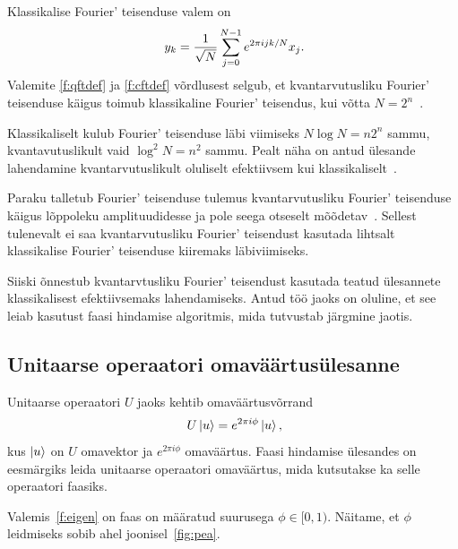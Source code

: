 \documentclass[12pt]{report}
\def\ket#1{\mathinner{|#1\rangle}}
\begin{document}
Klassikalise Fourier' teisenduse valem on
\begin{align}\label{f:cftdef}
    y_k = \frac{1}{\sqrt{N}} \sum_{j=0}^{N-1}e^{2\pi ijk/N} x_j \rlap{.}
\end{align}
Valemite \ref{f:qftdef} ja \ref{f:cftdef} võrdlusest selgub, et kvantarvutusliku Fourier' teisenduse käigus toimub klassikaline Fourier' teisendus, kui võtta \(N = 2^n\)~\cite{nielsen+chuang}.

Klassikaliselt kulub Fourier' teisenduse läbi viimiseks \(N \log{N}=n 2^n \) sammu, kvantavutuslikult vaid \(\log^2{N} = n^2\) sammu.
Pealt näha on antud ülesande lahendamine kvantarvutuslikult oluliselt efektiivsem kui klassikaliselt~\cite{nielsen+chuang}.

Paraku talletub Fourier' teisenduse tulemus kvantarvutusliku Fourier' teisenduse käigus lõppoleku amplituudidesse ja pole seega otseselt mõõdetav~\cite{nielnse+chuang}.
Sellest tulenevalt ei saa kvantarvutusliku Fourier' teisendust kasutada lihtsalt klassikalise Fourier' teisenduse kiiremaks läbiviimiseks.


Siiski õnnestub kvantarvtusliku Fourier' teisendust kasutada teatud ülesannete klassikalisest efektiivsemaks lahendamiseks.
Antud töö jaoks on oluline, et see leiab kasutust faasi hindamise algoritmis, mida tutvustab järgmine jaotis.


\subsection{Unitaarse operaatori omaväärtusülesanne}\label{sec:unitary}

Unitaarse operaatori \(U\) jaoks kehtib omaväärtusvõrrand
\begin{align}\label{f:eigen}
    U \ket{u} = e^{2\pi i\phi} \ket{u}\rlap{,}
\end{align}
kus \(\ket{u}\) on \(U\) omavektor ja \(e^{2\pi i\phi}\) omaväärtus.
Faasi hindamise ülesandes on eesmärgiks leida unitaarse operaatori omaväärtus, mida kutsutakse ka selle operaatori faasiks.

Valemis~\ref{f:eigen} on faas on määratud suurusega \(\phi \in [0, 1)\).
Näitame, et \(\phi\) leidmiseks sobib ahel joonisel~\ref{fig:pea}.
\end{document}
